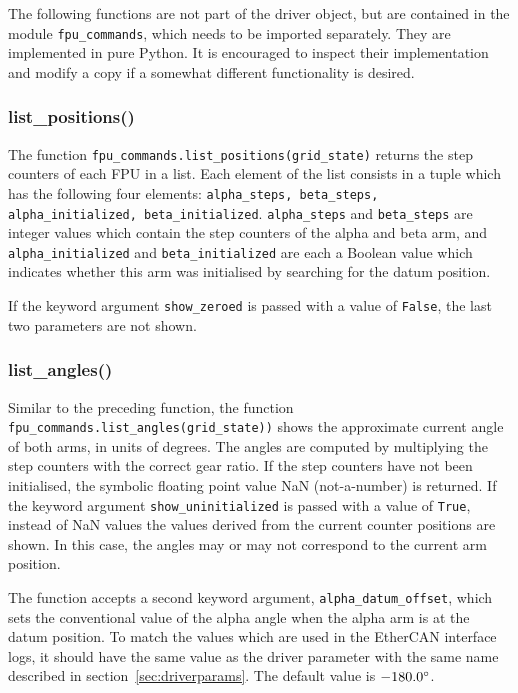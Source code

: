 \documentclass[11pt,a4paper]{scrartcl}
\begin{document}
The following functions are not part of the driver object, but are
contained in the module \texttt{fpu\_commands}, which needs to be
imported separately. They are implemented in pure Python. It is
encouraged to inspect their implementation and modify a copy if a
somewhat different functionality is desired.

\subsubsection{list\_positions()}
\label{sec:listpositions}
 
The function \texttt{fpu\_commands.list\_positions(grid\_state)}
returns the step counters of each FPU in a list.  Each element of the
list consists in a tuple which has the following four elements:
\texttt{alpha\_steps, beta\_steps, alpha\_initialized,
  beta\_initialized}. \texttt{alpha\_steps} and \texttt{beta\_steps}
are integer values which contain the step counters of the alpha and
beta arm, and \texttt{alpha\_initialized} and
\texttt{beta\_initialized} are each a Boolean value which indicates
whether this arm was initialised by searching for the datum position.

If the keyword argument \texttt{show\_zeroed} is passed with a value of
\texttt{False}, the last two parameters are not shown.

\subsubsection{list\_angles()}
\label{sec:listangles}

Similar to the preceding function, the function
\texttt{fpu\_commands.list\_angles(grid\_state))} shows the
approximate current angle of both arms, in units of degrees. The
angles are computed by multiplying the step counters with the correct
gear ratio. If the step counters have not been initialised, the
symbolic floating point value NaN (not-a-number) is returned.  If the
keyword argument \texttt{show\_uninitialized} is passed with a value
of \texttt{True}, instead of NaN values the values derived from the
current counter positions are shown. In this case, the angles may or
may not correspond to the current arm position.

 The function accepts a second keyword
argument, \texttt{alpha\_datum\_offset}, which sets the conventional
value of the alpha angle when the alpha arm is at the datum position.
To match the values which are used in the EtherCAN interface logs, it should have
the same value as the driver parameter with the same name described in
section~\ref{sec:driverparams}. The default value is $-180.0\degree$.
\end{document}
